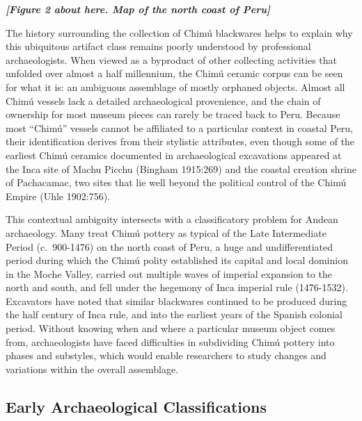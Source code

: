 \documentclass[]{interact}
\theoremstyle{plain}%
\theoremstyle{definition}
\theoremstyle{remark}
\begin{document}
\emph{\textbf{{[}Figure 2 about here. Map of the north coast of
Peru{]}}}

The history surrounding the collection of Chimú blackwares helps to
explain why this ubiquitous artifact class remains poorly understood by
professional archaeologists. When viewed as a byproduct of other
collecting activities that unfolded over almost a half millennium, the
Chimú ceramic corpus can be seen for what it is: an ambiguous assemblage
of mostly orphaned objects. Almost all Chimú vessels lack a detailed
archaeological provenience, and the chain of ownership for most museum
pieces can rarely be traced back to Peru. Because most ``Chimú'' vessels
cannot be affiliated to a particular context in coastal Peru, their
identification derives from their stylistic attributes, even though some
of the earliest Chimú ceramics documented in archaeological excavations
appeared at the Inca site of Machu Picchu (Bingham 1915:269) and the
coastal creation shrine of Pachacamac, two sites that lie well beyond
the political control of the Chimú Empire (Uhle 1902:756).

This contextual ambiguity intersects with a classificatory problem for
Andean archaeology. Many treat Chimú pottery as typical of the Late
Intermediate Period (c.~900-1476) on the north coast of Peru, a huge and
undifferentiated period during which the Chimú polity established its
capital and local dominion in the Moche Valley, carried out multiple
waves of imperial expansion to the north and south, and fell under the
hegemony of Inca imperial rule (1476-1532). Excavators have noted that
similar blackwares continued to be produced during the half century of
Inca rule, and into the earliest years of the Spanish colonial period.
Without knowing when and where a particular museum object comes from,
archaeologists have faced difficulties in subdividing Chimú pottery into
phases and substyles, which would enable researchers to study changes
and variations within the overall assemblage.

\hypertarget{early-archaeological-classifications}{%
\subsection{Early Archaeological
Classifications}\label{early-archaeological-classifications}}
\end{document}
